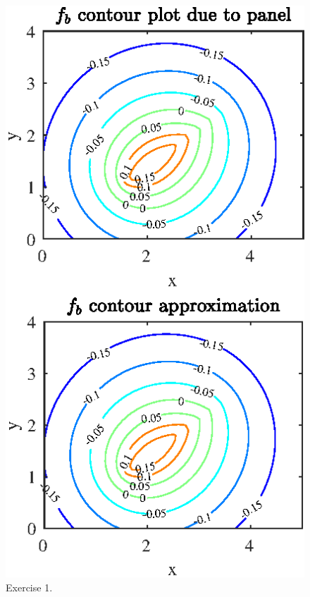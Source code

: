 \begin{figure}[htbp]
\centering
\includegraphics[scale=1]{graphs/e3g2.eps}
\caption{Exercise 1.}
\label{Exercise 2}
\end{figure}